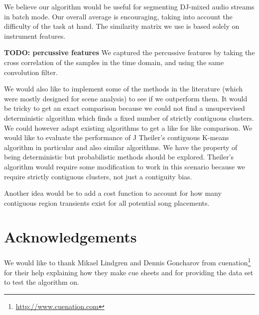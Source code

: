 \documentclass[twocolumn]{article}
\begin{document}
We believe our algorithm would be useful for segmenting DJ-mixed audio streams in batch mode. Our overall average is encouraging, taking into account the difficulty of the task at hand. The similarity matrix we use is based solely on instrument features. 

\textbf{TODO: percussive features}
We captured the percussive features by taking the cross correlation of the samples in the time domain, and using the same convolution filter. 

We would also like to implement some of the methods in the literature (which were mostly designed for scene analysis) to see if we outperform them. It would be tricky to get an exact comparison because we could not find a unsupervised deterministic algorithm which finds a fixed number of strictly contiguous clusters. We could however adapt existing algorithms to get a like for like comparison. We would like to evaluate the performance of J Theiler's contiguous K-means algorithm in particular \cite{theiler1997contiguity} and also similar algorithms. We have the property of being deterministic but probabilistic methods should be explored. Theiler's algorithm would require some modification to work in this scenario because we require strictly contiguous clusters, not just a contiguity bias. 

Another idea would be to add a cost function to account for how many contiguous region transients exist for all potential song placements. 

\section{Acknowledgements}

We would like to thank Mikael Lindgren and Dennis Goncharov from cuenation\footnote{\url{http://www.cuenation.com}} for their help explaining how they make cue sheets and for providing the data set to test the algorithm on.




\end{document}
